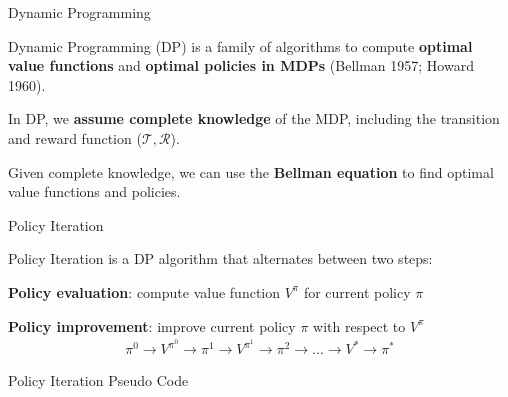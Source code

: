 \begin{frame}{Dynamic Programming}
    \blist
    	\itemsep=10pt
        \item Dynamic Programming (DP) is a family of algorithms to compute \textbf{optimal value functions} and \textbf{optimal policies in MDPs} (Bellman 1957; Howard 1960).
        \item In DP, we \textbf{assume complete knowledge} of the MDP, including the transition and reward function ($\mathcal{T}, \mathcal{R}$).
        \item Given complete knowledge, we can use the \textbf{Bellman equation} to find optimal value functions and policies.
    \elist   
\end{frame}

\begin{frame}{Policy Iteration}
	\begin{bluetitlebox}{Policy Iteration}
     is a DP algorithm that alternates between two steps: \\
        \blist
            \item \textbf{Policy evaluation}: compute value function $V^{\pi}$ for current policy $\pi$
            \item \textbf{Policy improvement}: improve current policy $\pi$ with respect to $V^{\pi}$
        \elist 
	    \begin{align*}
	        \pi^{0} \to V^{\pi^{0}}\to \pi^{1} \to V^{\pi^{1} } \to\pi^{2} \to ... \to V^{*} \to \pi^{*} 
	    \end{align*}
    \end{bluetitlebox}

\end{frame}

\begin{frame}[fragile]{Policy Iteration Pseudo Code}
\centering
{}
\end{frame}



